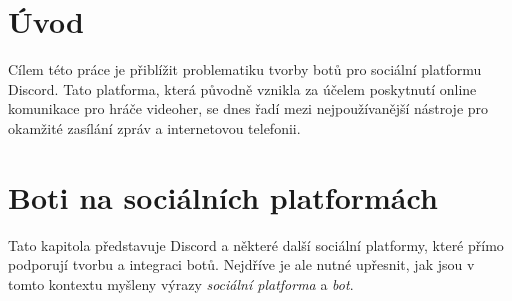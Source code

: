 \documentclass[FM]{tulthesis}
\begin{document}
	
	
	\chapter{Úvod}
	
	
	
	
	Cílem této práce je přiblížit problematiku tvorby botů pro sociální platformu \mbox{Discord}. Tato platforma, která původně vznikla za účelem poskytnutí online komunikace pro hráče videoher, se dnes řadí mezi nejpoužívanější nástroje pro okamžité zasílání zpráv a internetovou telefonii.
			
	\chapter{Boti na sociálních platformách}\label{Chapter2}
	
	Tato kapitola představuje Discord a některé další sociální platformy, které přímo podporují tvorbu a integraci botů. Nejdříve je ale nutné upřesnit, jak jsou v tomto kontextu myšleny výrazy \textit{sociální platforma} a \textit{bot}.
	
\end{document}
